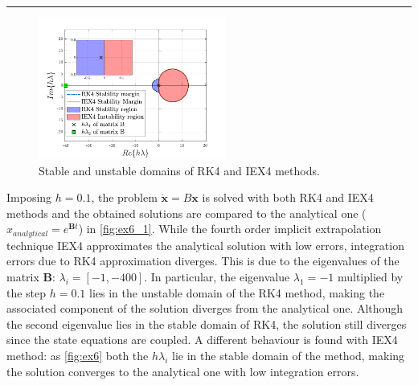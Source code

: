 \documentclass[11pt,a4paper,oneside]{article}
\renewcommand{\vec}[1]{\mathbf{#1}}
\begin{document}
\medskip \hrule \medskip

\begin{figure}
\centering
    \includegraphics[width = 0.55\textwidth]{gfx/ex6_1.pdf}
    \caption{Stable and unstable domains of RK4 and IEX4 methods.}
    \label{fig:ex6}
\end{figure}

Imposing $h=0.1$, the problem $\dot{\vec x} = B \vec x$ is solved with both RK4 and IEX4 methods 
and the obtained solutions are compared to the analytical one ($x_{analytical}=e^{\vec{B}t}$) in 
\autoref{fig:ex6_1}. While the fourth order implicit extrapolation technique IEX4 approximates the 
analytical solution with low errors, integration errors due to RK4 approximation diverges. 
This is due to the eigenvalues of the matrix $\vec{B}$: $\lambda_i= [-1, -400]$. In particular, 
the eigenvalue $\lambda_1= -1$ multiplied by the step $h=0.1$ lies in the unstable domain of the 
RK4 method, making the associated component of the solution diverges from the analytical one. 
Although the second eigenvalue lies in the stable domain of RK4, the solution still diverges since 
the state equations are coupled. A different behaviour is found with IEX4 method: as 
\autoref{fig:ex6} both the $h\lambda_i$ lie in the stable domain of the method, making the 
solution converges to the analytical one with low integration errors.
\end{document}
